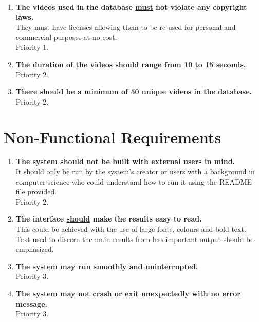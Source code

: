 \begin{enumerate}

    \item \textbf{The videos used in the database \underline{must} not violate any copyright laws.}\\
    They must have licenses allowing them to be re-used for personal and commercial purposes at no cost.\\
    Priority 1.
    
    \item \textbf{The duration of the videos \underline{should} range from 10 to 15 seconds.}\\
    Priority 2.

    \item \textbf{There \underline{should} be a minimum of 50 unique videos in the database.}\\
    Priority 2.
        
\end{enumerate}

\section{Non-Functional Requirements}

\begin{enumerate}
	
	\item \textbf{The system \underline{should} not be built with external users in mind.}\\
	It should only be run by the system's creator or users with a background in computer science who could understand how to run it using the README file provided.\\
	Priority 2.

    \item \textbf{The interface \underline{should} make the results easy to read.}\\
    This could be achieved with the use of large fonts, colours and bold text. Text used to discern the main results from less important output should be emphasized.
    
    \item \textbf{The system \underline{may} run smoothly and uninterrupted.}\\
    Priority 3.
    
    \item \textbf{The system \underline{may} not crash or exit unexpectedly with no error message.}\\
    Priority 3.

\end{enumerate}

